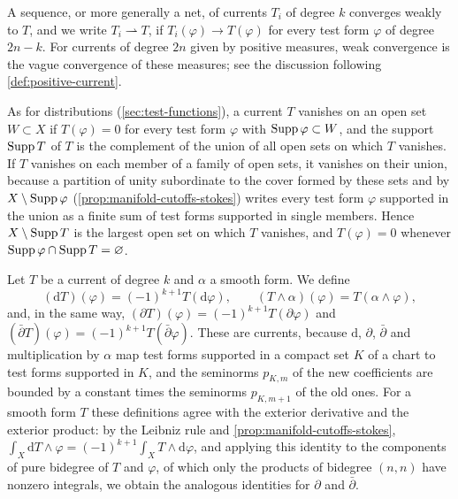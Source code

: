 A sequence, or more generally a net, of currents $T_i$ of degree $k$ converges weakly to $T$, and we write $T_i\rightharpoonup T$, if $T_i(\varphi)\to T(\varphi)$ for every test form $\varphi$ of degree $2n-k$. For currents of degree $2n$ given by positive measures, weak convergence is the vague convergence of these measures; see the discussion following \cref{def:positive-current}.

As for distributions (\cref{sec:test-functions}), a current $T$ vanishes on an open set $W\subset X$ if $T(\varphi)=0$ for every test form $\varphi$ with $\operatorname{Supp}\varphi\subset W$, and the support $\operatorname{Supp} T$ of $T$ is the complement of the union of all open sets on which $T$ vanishes. If $T$ vanishes on each member of a family of open sets, it vanishes on their union, because a partition of unity subordinate to the cover formed by these sets and by $X\setminus\operatorname{Supp}\varphi$ (\cref{prop:manifold-cutoffs-stokes}) writes every test form $\varphi$ supported in the union as a finite sum of test forms supported in single members. Hence $X\setminus\operatorname{Supp} T$ is the largest open set on which $T$ vanishes, and $T(\varphi)=0$ whenever $\operatorname{Supp}\varphi\cap\operatorname{Supp} T=\varnothing$.

Let $T$ be a current of degree $k$ and $\alpha$ a smooth form. We define
\[
 (\mathrm{d}T)(\varphi)=(-1)^{k+1}T(\mathrm{d}\varphi),\qquad
 (T\wedge\alpha)(\varphi)=T(\alpha\wedge\varphi),
\]
and, in the same way, $(\partial T)(\varphi)=(-1)^{k+1}T(\partial\varphi)$ and $(\bar\partial T)(\varphi)=(-1)^{k+1}T(\bar\partial\varphi)$. These are currents, because $\mathrm d$, $\partial$, $\bar\partial$ and multiplication by $\alpha$ map test forms supported in a compact set $K$ of a chart to test forms supported in $K$, and the seminorms $p_{K,m}$ of the new coefficients are bounded by a constant times the seminorms $p_{K,m+1}$ of the old ones. For a smooth form $T$ these definitions agree with the exterior derivative and the exterior product: by the Leibniz rule and \cref{prop:manifold-cutoffs-stokes}, $\int_X\mathrm dT\wedge\varphi=(-1)^{k+1}\int_XT\wedge\mathrm d\varphi$, and applying this identity to the components of pure bidegree of $T$ and $\varphi$, of which only the products of bidegree $(n,n)$ have nonzero integrals, we obtain the analogous identities for $\partial$ and $\bar\partial$.

